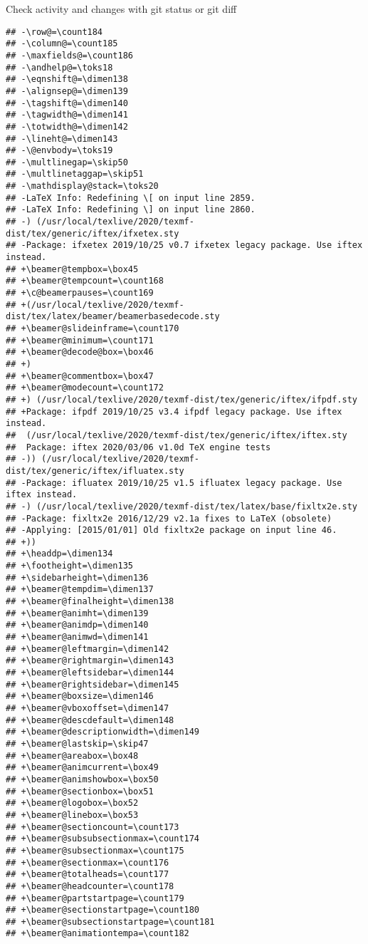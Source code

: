 \documentclass[ignorenonframetext,]{beamer}
\begin{document}
\begin{frame}[fragile]{Check activity and changes with git status or git
diff}
\begin{verbatim}
## -\row@=\count184
## -\column@=\count185
## -\maxfields@=\count186
## -\andhelp@=\toks18
## -\eqnshift@=\dimen138
## -\alignsep@=\dimen139
## -\tagshift@=\dimen140
## -\tagwidth@=\dimen141
## -\totwidth@=\dimen142
## -\lineht@=\dimen143
## -\@envbody=\toks19
## -\multlinegap=\skip50
## -\multlinetaggap=\skip51
## -\mathdisplay@stack=\toks20
## -LaTeX Info: Redefining \[ on input line 2859.
## -LaTeX Info: Redefining \] on input line 2860.
## -) (/usr/local/texlive/2020/texmf-dist/tex/generic/iftex/ifxetex.sty
## -Package: ifxetex 2019/10/25 v0.7 ifxetex legacy package. Use iftex instead.
## +\beamer@tempbox=\box45
## +\beamer@tempcount=\count168
## +\c@beamerpauses=\count169
## +(/usr/local/texlive/2020/texmf-dist/tex/latex/beamer/beamerbasedecode.sty
## +\beamer@slideinframe=\count170
## +\beamer@minimum=\count171
## +\beamer@decode@box=\box46
## +)
## +\beamer@commentbox=\box47
## +\beamer@modecount=\count172
## +) (/usr/local/texlive/2020/texmf-dist/tex/generic/iftex/ifpdf.sty
## +Package: ifpdf 2019/10/25 v3.4 ifpdf legacy package. Use iftex instead.
##  (/usr/local/texlive/2020/texmf-dist/tex/generic/iftex/iftex.sty
##  Package: iftex 2020/03/06 v1.0d TeX engine tests
## -)) (/usr/local/texlive/2020/texmf-dist/tex/generic/iftex/ifluatex.sty
## -Package: ifluatex 2019/10/25 v1.5 ifluatex legacy package. Use iftex instead.
## -) (/usr/local/texlive/2020/texmf-dist/tex/latex/base/fixltx2e.sty
## -Package: fixltx2e 2016/12/29 v2.1a fixes to LaTeX (obsolete)
## -Applying: [2015/01/01] Old fixltx2e package on input line 46.
## +))
## +\headdp=\dimen134
## +\footheight=\dimen135
## +\sidebarheight=\dimen136
## +\beamer@tempdim=\dimen137
## +\beamer@finalheight=\dimen138
## +\beamer@animht=\dimen139
## +\beamer@animdp=\dimen140
## +\beamer@animwd=\dimen141
## +\beamer@leftmargin=\dimen142
## +\beamer@rightmargin=\dimen143
## +\beamer@leftsidebar=\dimen144
## +\beamer@rightsidebar=\dimen145
## +\beamer@boxsize=\dimen146
## +\beamer@vboxoffset=\dimen147
## +\beamer@descdefault=\dimen148
## +\beamer@descriptionwidth=\dimen149
## +\beamer@lastskip=\skip47
## +\beamer@areabox=\box48
## +\beamer@animcurrent=\box49
## +\beamer@animshowbox=\box50
## +\beamer@sectionbox=\box51
## +\beamer@logobox=\box52
## +\beamer@linebox=\box53
## +\beamer@sectioncount=\count173
## +\beamer@subsubsectionmax=\count174
## +\beamer@subsectionmax=\count175
## +\beamer@sectionmax=\count176
## +\beamer@totalheads=\count177
## +\beamer@headcounter=\count178
## +\beamer@partstartpage=\count179
## +\beamer@sectionstartpage=\count180
## +\beamer@subsectionstartpage=\count181
## +\beamer@animationtempa=\count182

\end{verbatim}
\end{frame}
\end{document}
